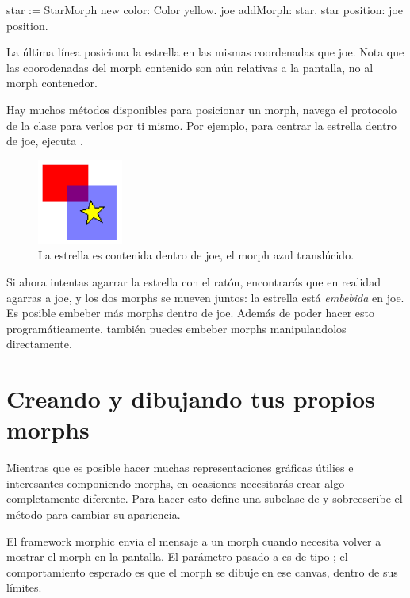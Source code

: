 \documentclass[a4paper,10pt,twoside]{book}
\begin{document}
\begin{code}{}
star := StarMorph new color: Color yellow.
joe addMorph: star.
star position: joe position.
\end{code}

\noindent
La \'ultima l\'inea posiciona la estrella en las mismas coordenadas que joe.
Nota que las coorodenadas del morph contenido son a\'un relativas a la pantalla, no al morph contenedor.

Hay muchos m\'etodos disponibles para posicionar un morph, navega el protocolo  de la clase  para verlos por ti mismo.
Por ejemplo,
para centrar la estrella dentro de joe, ejecuta   .

\begin{figure}[ht]
	\centerline{\includegraphics{joeStar}}
	\caption{La estrella es contenida dentro de joe, el morph azul transl\'ucido.
		}
\end{figure}

Si ahora intentas agarrar la estrella con el rat\'on, encontrar\'as que en realidad agarras a joe, y los dos morphs se mueven juntos: la estrella est\'a \emph{embebida} en joe.
Es posible embeber m\'as morphs dentro de joe.
Adem\'as de poder hacer esto program\'aticamente, tambi\'en puedes embeber morphs manipulandolos directamente.

\section{Creando y dibujando tus propios morphs}

Mientras que es posible hacer muchas representaciones gr\'aficas \'utilies e interesantes componiendo morphs, en ocasiones necesitar\'as crear algo completamente diferente.
Para hacer esto define una subclase de  y sobreescribe el m\'etodo  para cambiar su apariencia.

El framework morphic envia el mensaje  a un morph cuando necesita volver a mostrar el morph en la pantalla. El par\'ametro pasado a  es de tipo ; el comportamiento esperado es que el morph se dibuje en ese canvas, dentro de sus límites.
\end{document}

